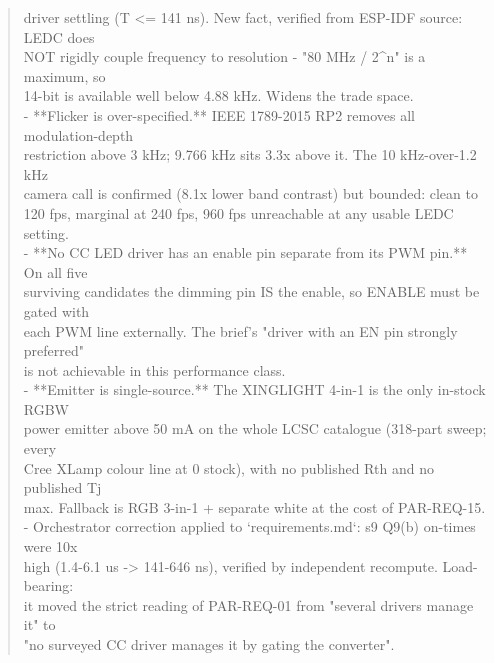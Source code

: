 \documentclass[11pt,a4paper]{article}
\begin{document}
\begin{quote}
  driver settling (T \textless{}= 141 ns). New fact, verified from ESP-IDF source: LEDC does\\
  NOT rigidly couple frequency to resolution - "80 MHz / 2\textasciicircum{}n" is a maximum, so\\
  14-bit is available well below 4.88 kHz. Widens the trade space.\\
- {*}{*}Flicker is over-specified.{*}{*} IEEE 1789-2015 RP2 removes all modulation-depth\\
  restriction above 3 kHz; 9.766 kHz sits 3.3x above it. The 10 kHz-over-1.2 kHz\\
  camera call is confirmed (8.1x lower band contrast) but bounded: clean to\\
  120 fps, marginal at 240 fps, 960 fps unreachable at any usable LEDC setting.\\
- {*}{*}No CC LED driver has an enable pin separate from its PWM pin.{*}{*} On all five\\
  surviving candidates the dimming pin IS the enable, so ENABLE must be gated with\\
  each PWM line externally. The brief's "driver with an EN pin strongly preferred"\\
  is not achievable in this performance class.\\
- {*}{*}Emitter is single-source.{*}{*} The XINGLIGHT 4-in-1 is the only in-stock RGBW\\
  power emitter above 50 mA on the whole LCSC catalogue (318-part sweep; every\\
  Cree XLamp colour line at 0 stock), with no published Rth and no published Tj\\
  max. Fallback is RGB 3-in-1 + separate white at the cost of PAR-REQ-15.\\
- Orchestrator correction applied to `requirements.md`: s9 Q9(b) on-times were 10x\\
  high (1.4-6.1 us -\textgreater{} 141-646 ns), verified by independent recompute. Load-bearing:\\
  it moved the strict reading of PAR-REQ-01 from "several drivers manage it" to\\
  "no surveyed CC driver manages it by gating the converter".
\end{quote}
\end{document}
